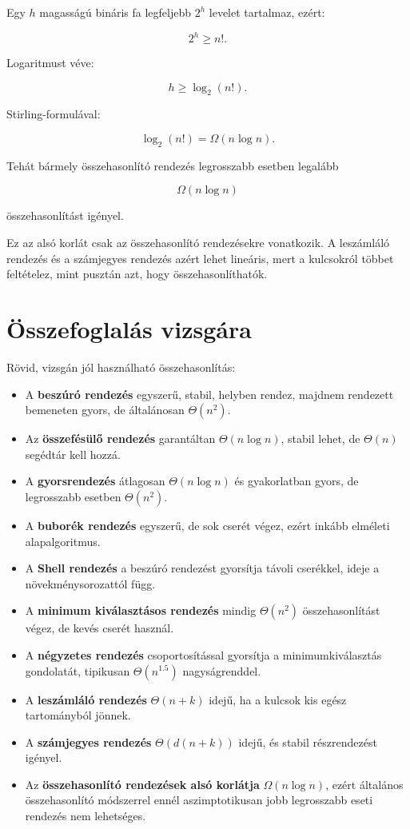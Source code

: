 Egy $h$ magasságú bináris fa legfeljebb $2^h$ levelet tartalmaz, ezért:

\[
2^h \geq n!.
\]

Logaritmust véve:

\[
h \geq \log_2(n!).
\]

Stirling-formulával:

\[
\log_2(n!)=\Omega(n\log n).
\]

Tehát bármely összehasonlító rendezés legrosszabb esetben legalább

\[
\Omega(n\log n)
\]

összehasonlítást igényel.

\begin{warningbox}
Ez az alsó korlát csak az összehasonlító rendezésekre vonatkozik. A leszámláló rendezés és a számjegyes rendezés azért lehet lineáris, mert a kulcsokról többet feltételez, mint pusztán azt, hogy összehasonlíthatók.
\end{warningbox}

\section{Összefoglalás vizsgára}

\begin{center}

\end{center}

Rövid, vizsgán jól használható összehasonlítás:

\begin{itemize}
  \item A \textbf{beszúró rendezés} egyszerű, stabil, helyben rendez, majdnem rendezett bemeneten gyors, de általánosan $\Theta(n^2)$.
  \item Az \textbf{összefésülő rendezés} garantáltan $\Theta(n\log n)$, stabil lehet, de $\Theta(n)$ segédtár kell hozzá.
  \item A \textbf{gyorsrendezés} átlagosan $\Theta(n\log n)$ és gyakorlatban gyors, de legrosszabb esetben $\Theta(n^2)$.
  \item A \textbf{buborék rendezés} egyszerű, de sok cserét végez, ezért inkább elméleti alapalgoritmus.
  \item A \textbf{Shell rendezés} a beszúró rendezést gyorsítja távoli cserékkel, ideje a növekménysorozattól függ.
  \item A \textbf{minimum kiválasztásos rendezés} mindig $\Theta(n^2)$ összehasonlítást végez, de kevés cserét használ.
  \item A \textbf{négyzetes rendezés} csoportosítással gyorsítja a minimumkiválasztás gondolatát, tipikusan $\Theta(n^{1.5})$ nagyságrenddel.
  \item A \textbf{leszámláló rendezés} $\Theta(n+k)$ idejű, ha a kulcsok kis egész tartományból jönnek.
  \item A \textbf{számjegyes rendezés} $\Theta(d(n+k))$ idejű, és stabil részrendezést igényel.
  \item Az \textbf{összehasonlító rendezések alsó korlátja} $\Omega(n\log n)$, ezért általános összehasonlító módszerrel ennél aszimptotikusan jobb legrosszabb eseti rendezés nem lehetséges.
\end{itemize}

